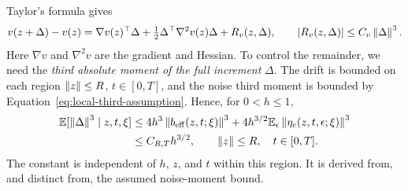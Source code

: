 Taylor's formula gives
\begin{equation}\label{eq:taylorexpansion}
 v(z+\Delta)-v(z)
 =\nabla v(z)^\top\Delta
  +\tfrac12\Delta^\top\nabla^2v(z)\Delta+R_v(z,\Delta),
 \qquad |R_v(z,\Delta)|\leq C_v\left\lVert \Delta\right\rVert^3.
\end{equation}
Here $\nabla v$ and $\nabla^2v$ are the gradient and Hessian. To control the remainder, we need the \emph{third absolute moment of the full increment} $\Delta$. The drift is bounded on each region $\left\lVert z\right\rVert\leq R$, $t\in[0,T]$, and the noise third moment is bounded by Equation~\eqref{eq:local-third-assumption}. Hence, for $0<h\leq1$,
\begin{align}\label{eq:thirdmoment}
 \mathbb E[\left\lVert \Delta\right\rVert^3\mid z,t,\xi]
 &\leq4h^3\left\lVert b_{\mathrm{eff}}(z,t;\xi)\right\rVert^3
   +4h^{3/2}\mathbb E_\epsilon\left\lVert \eta_c(z,t,\epsilon;\xi)\right\rVert^3\notag\\
 &\leq C_{R,T}h^{3/2},
 \qquad \left\lVert z\right\rVert\leq R,\quad t\in[0,T].
\end{align}
The constant is independent of $h$, $z$, and $t$ within this region. It is derived from, and distinct from, the assumed noise-moment bound.

